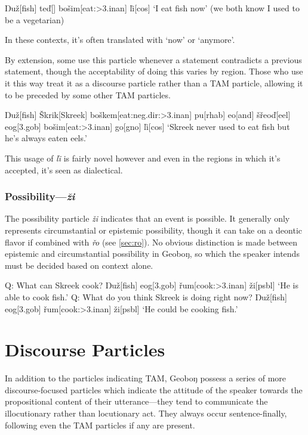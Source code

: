 \documentclass[a4paper,11pt,oneside,openany]{memoir}
\newcommand{\vd}{ď}
\newcommand{\vz}{ž}
\newcommand{\vs}{š}
\newcommand{\vr}{ř}
\newcommand{\vl}{ľ}
\newcommand{\vS}{Š}
\newcommand{\Engma}{Ŋ}
\newcommand{\engma}{ŋ}
\begin{document}
\ex
\begingl
\Engma u\vz[fish]
te\vd[]
bo\vs im[eat:{\sc >3.inan}]
\vl i[\sc cos]
\glft `I eat fish now' (we both know I used to be a vegetarian)
\endgl
\xe

In these contexts, it's often translated with `now' or `anymore'.

By extension, some use this particle whenever a statement contradicts a previous statement, though the acceptability of doing this varies by region. Those who use it this way treat it as a discourse particle rather than a TAM particle, allowing it to be preceded by some other TAM particles.

\ex {}
\begingl
\Engma u\vz[fish]
\vS krik[Skreek]
bo\vs kem[eat:{\sc neg.dir:>3.inan}]
pu[\sc rhab]
eo[and]
\vs\vr eo\vd[eel]
eog[\sc 3.gob]
bo\vs im[eat:{\sc >3.inan}]
go[\sc gno]
\vl i[\sc cos]
\glft `Skreek never used to eat fish but he's always eaten eels.'
\endgl
\xe

This usage of \textit{\vl i} is fairly novel however and even in the regions in which it's accepted, it's seen as dialectical.

\subsubsection{Possibility---\textit{\vz i}}

The possibility particle \textit{\vz i} indicates that an event is possible. It generally only represents circumstantial or epistemic possibility, though it can take on a deontic flavor if combined with \textit{\vr o} (see \ref{sec:ro}). No obvious distinction is made between epistemic and circumstantial possibility in Geobo{\engma}, so which the speaker intends must be decided based on context alone.

\pex 
\a
\begingl
\glpreamble
Q: What can Skreek cook?
\endpreamble
{}
\Engma u\vz[fish]
eog[\sc 3.gob]
\vr um[cook:{\sc >3.inan}]
\vz i[\sc psbl]
\glft \phantom{A: }`He is able to cook fish.'
\endgl
\a 
\begingl
\glpreamble
Q: What do you think Skreek is doing right now?
\endpreamble
{}
\Engma u\vz[fish]
eog[\sc 3.gob]
\vr um[cook:{\sc >3.inan}]
\vz i[\sc psbl]
\glft \phantom{A: }`He could be cooking fish.'
\endgl
\xe

\section{Discourse Particles}

In addition to the particles indicating TAM, Geobo{\engma} possess a series of more discourse-focused particles which indicate the attitude of the speaker towards the propositional content of their utterance---they tend to communicate the illocutionary rather than locutionary act. They always occur sentence-finally, following even the TAM particles if any are present.
\end{document}
